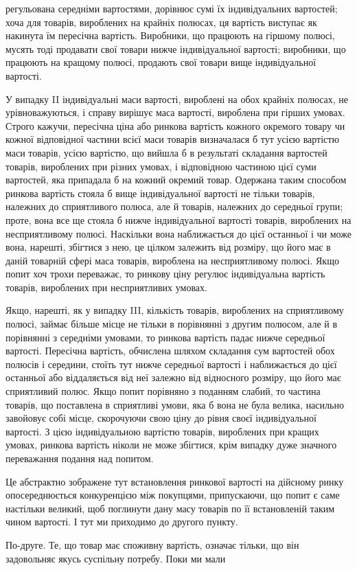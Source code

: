\parcont{}  %
регульована середніми вартостями, дорівнює сумі їх індивідуальних вартостей; хоча для товарів,
вироблених на крайніх полюсах, ця вартість виступає як накинута їм пересічна вартість. Виробники, що
працюють на гіршому полюсі, мусять тоді продавати свої товари нижче індивідуальної вартості;
виробники,
що працюють на кращому полюсі, продають свої товари вище
індивідуальної вартості.

У випадку II індивідуальні маси вартості, вироблені на обох
крайніх полюсах, не урівноважуються, і справу вирішує маса
вартості, вироблена при гірших умовах. Строго кажучи, пересічна ціна або ринкова вартість кожного
окремого товару чи
кожної відповідної частини всієї маси товарів визначалася б тут
усією вартістю маси товарів, усією вартістю, що вийшла б
в результаті складання вартостей товарів, вироблених при різних умовах, і відповідною частиною цієї
суми вартостей, яка
припадала б на кожний окремий товар. Одержана таким способом ринкова вартість стояла б вище
індивідуальної вартості
не тільки товарів, належних до сприятливого полюса, але й товарів, належних до середньої групи;
проте, вона все ще стояла б
нижче індивідуальної вартості товарів, вироблених на несприятливому полюсі. Наскільки вона
наближається до цієї останньої
і чи може вона, нарешті, збігтися з нею, це цілком залежить від
розміру, що його має в даній товарній сфері маса товарів,
вироблена на несприятливому полюсі. Якщо попит хоч трохи
переважає, то ринкову ціну регулює індивідуальна вартість товарів, вироблених при несприятливих
умовах.

Якщо, нарешті, як у випадку III, кількість товарів, вироблених на сприятливому полюсі, займає більше
місце не тільки
в порівнянні з другим полюсом, але й в порівнянні з середніми
умовами, то ринкова вартість падає нижче середньої вартості.
Пересічна вартість, обчислена шляхом складання сум вартостей
обох полюсів і середини, стоїть тут нижче середньої вартості
і наближається до цієї останньої або віддаляється від неї
залежно від відносного розміру, що його має сприятливий полюс.
Якщо попит порівняно з поданням слабий, то частина товарів,
що поставлена в сприятливі умови, яка б вона не була велика,
насильно завойовує собі місце, скорочуючи свою ціну до рівня
своєї індивідуальної вартості. З цією індивідуальною вартістю
товарів, вироблених при кращих умовах, ринкова вартість ніколи
не може збігтися, крім випадку дуже значного переважання подання над попитом.

Це абстрактно зображене тут встановлення ринкової вартості на дійсному ринку опосереднюється
конкуренцією між
покупцями, припускаючи, що попит є саме настільки великий,
щоб поглинути дану масу товарів по її встановленій таким
чином вартості. І тут ми приходимо до другого пункту.

По-друге. Те, що товар має споживну вартість, означає тільки,
що він задовольняє якусь суспільну потребу. Поки ми мали
\parbreak{}  %
